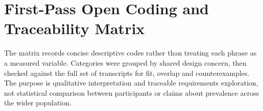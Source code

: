 \documentclass[12pt, a4paper]{article}
\begin{document}
\section{First-Pass Open Coding and Traceability Matrix}
The matrix records concise descriptive codes rather than treating each phrase as a measured variable. Categories were grouped by shared design concern, then checked against the full set of transcripts for fit, overlap and counterexamples. The purpose is qualitative interpretation and traceable requirements exploration, not statistical comparison between participants or claims about prevalence across the wider population.
\end{document}
